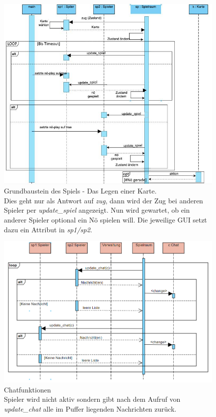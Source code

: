 \documentclass[11pt, a4paper, oneside]{memoir}                                                      %
\begin{document}
        \begin{figure}[h]
			\centering
            \includegraphics[scale=0.7]{../img/Sequenz_Diagramm/karte.png}
            \caption{Grundbaustein des Spiels - Das Legen einer Karte. \\
                    Dies geht nur als Antwort auf \textit{zug}, dann wird der Zug bei anderen Spieler per \textit{update\_spiel} angezeigt. Nun wird gewartet, ob ein anderer Spieler optional ein Nö spielen will. Die jeweilige GUI setzt dazu ein Attribut in \textit{sp1/sp2}.}
        \end{figure}

        \begin{figure}[h]
			\centering
			\includegraphics[scale=0.5]{../img/Sequenz_Diagramm/chat.png}
            \caption{Chatfunktionen \\
                Spieler wird nicht aktiv sondern gibt nach dem Aufruf von \textit{update\_chat} alle im Puffer liegenden Nachrichten zurück.}
        \end{figure}
\end{document}
